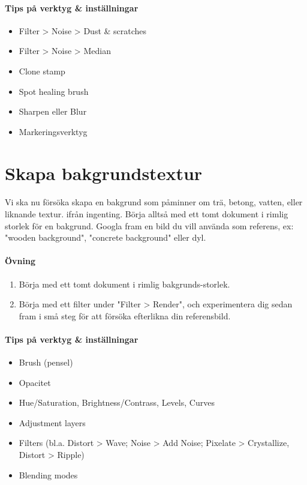 \documentclass{article}
\begin{document}
    \paragraph{Tips på verktyg \& inställningar}
      \begin{itemize}
        \item Filter > Noise > Dust \& scratches
        \item Filter > Noise > Median
        \item Clone stamp
        \item Spot healing brush
        \item Sharpen eller Blur
        \item Markeringsverktyg
      \end{itemize}


  \section{Skapa bakgrundstextur}
    \paragraph{}
    Vi ska nu försöka skapa en bakgrund som påminner om trä, betong, vatten, eller liknande textur. ifrån ingenting. Börja alltså med ett tomt dokument i rimlig storlek för en bakgrund. Googla fram en bild du vill använda som referens, ex: "wooden background", "concrete background" eller dyl.

    \paragraph{Övning}
      \begin{enumerate}
        \item Börja med ett tomt dokument i rimlig bakgrunds-storlek.
        \item Börja med ett filter under "Filter > Render", och experimentera dig sedan fram i små steg för att försöka efterlikna din referensbild.
      \end{enumerate}

    \paragraph{Tips på verktyg \& inställningar}
      \begin{itemize}
        \item Brush (pensel)
        \item Opacitet
        \item Hue/Saturation, Brightness/Contrass, Levels, Curves
        \item Adjustment layers
        \item Filters (bl.a. Distort > Wave; Noise > Add Noise; Pixelate > Crystallize, Distort > Ripple)
        \item Blending modes
      \end{itemize}
\end{document}
